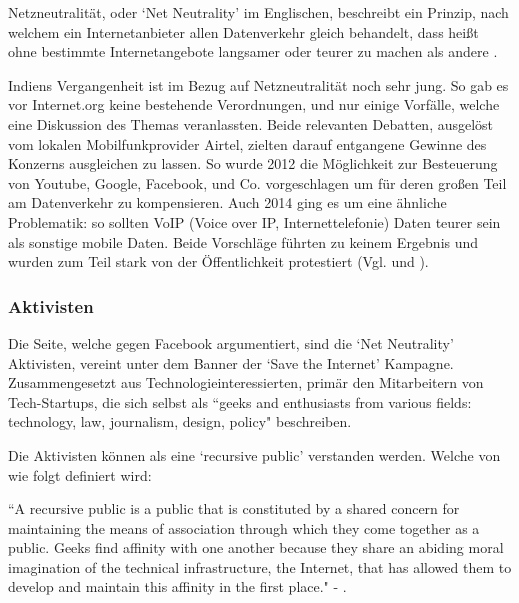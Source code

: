 \documentclass{article}
\begin{document}
Netzneutralität, oder `Net Neutrality' im Englischen, beschreibt ein Prinzip, nach welchem ein Internetanbieter allen Datenverkehr gleich behandelt, dass heißt ohne bestimmte Internetangebote langsamer oder teurer zu machen als andere \autocite{netzneutralität}.

\medskip

Indiens Vergangenheit ist im Bezug auf Netzneutralität noch sehr jung. So gab es vor Internet.org keine bestehende Verordnungen, und nur einige Vorfälle, welche eine Diskussion des Themas veranlassten.
Beide relevanten Debatten, ausgelöst vom lokalen Mobilfunkprovider Airtel, zielten darauf entgangene Gewinne des Konzerns ausgleichen zu lassen.
So wurde 2012 die Möglichkeit zur Besteuerung von Youtube, Google, Facebook, und Co. vorgeschlagen um für deren großen Teil am Datenverkehr zu kompensieren.
Auch 2014 ging es um eine ähnliche Problematik: so sollten VoIP (Voice over IP, Internettelefonie) Daten teurer sein als sonstige mobile Daten.
Beide Vorschläge führten zu keinem Ergebnis und wurden zum Teil stark von der Öffentlichkeit protestiert (Vgl. \textcite[253]{everydayLife} und \textcite{airtelVoip}).

\subsubsection{Aktivisten}

Die Seite, welche gegen Facebook argumentiert, sind die `Net Neutrality' Aktivisten, vereint unter dem Banner der `Save the Internet' Kampagne.
Zusammengesetzt aus Technologieinteressierten, primär den Mitarbeitern von Tech-Startups, die sich selbst als ``geeks and enthusiasts from various fields: technology, law, journalism, design, policy" \parencite{sti2015} beschreiben.

\medskip

Die Aktivisten können als eine `recursive public' verstanden werden. Welche von \textcite{twoBits} wie folgt definiert wird:

\medskip

``A recursive public is a public that is constituted by a shared concern for maintaining the means of association through which they come together as a public.
Geeks find affinity with one another because they share an abiding moral imagination of the technical infrastructure, the Internet, that has allowed them to develop and maintain this affinity in the first place." - \cite[28]{twoBits}.

\medskip
\end{document}
